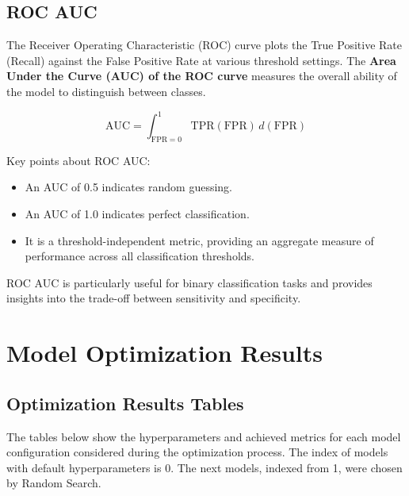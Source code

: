 \documentclass{article}%
\begin{document}
%
\subsection{ROC AUC}%
\label{subsec:ROCAUC}%

                The Receiver Operating Characteristic (ROC) curve plots the True Positive Rate (Recall) against the False Positive Rate at various threshold settings. 
                The \textbf{Area Under the Curve (AUC) of the ROC curve} measures the overall ability of the model to distinguish between classes. 

                \[
                \text{AUC} = \int_{\text{FPR}=0}^{1} \text{TPR}(\text{FPR}) \, d(\text{FPR})
                \]

                Key points about ROC AUC:
                \begin{itemize}
                    \item An AUC of 0.5 indicates random guessing.
                    \item An AUC of 1.0 indicates perfect classification.
                    \item It is a threshold-independent metric, providing an aggregate measure of performance across all classification thresholds.
                \end{itemize}

                ROC AUC is particularly useful for binary classification tasks and provides insights into the trade-off between sensitivity and specificity.
                

%
\newpage%
\section{Model Optimization Results}%
\label{sec:ModelOptimizationResults}%
\subsection{Optimization Results Tables}%
\label{subsec:OptimizationResultsTables}%
The tables below show the hyperparameters and achieved metrics for each model configuration considered during the optimization process. The index of models with default hyperparameters is 0. The next models, indexed from 1, were chosen by Random Search.%
\end{document}
